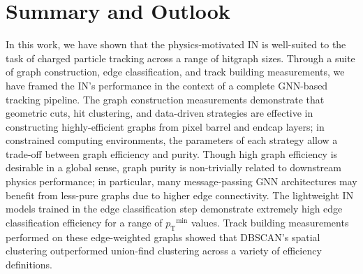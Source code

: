 \documentclass[twocolumn]{svjour3}
\newcommand{\pt}{\ensuremath{p_{\mathrm{T}}}\xspace}
\begin{document}


\section{Summary and Outlook}
\label{sec:summary}
In this work, we have shown that the physics-motivated IN is well-suited to the task of charged particle tracking across a range of hitgraph sizes. 
Through a suite of graph construction, edge classification, and track building measurements, we have framed the IN's performance in the context of a complete GNN-based tracking pipeline. 
The graph construction measurements demonstrate that geometric cuts, hit clustering, and data-driven strategies are effective in constructing highly-efficient graphs from pixel barrel and endcap layers; in constrained computing environments, the parameters of each strategy allow a trade-off between graph efficiency and purity. 
Though high graph efficiency is desirable in a global sense, graph purity is non-trivially related to downstream physics performance; in particular, many message-passing GNN architectures may benefit from less-pure graphs due to higher edge connectivity.
The lightweight IN models trained in the edge classification step demonstrate extremely high edge classification efficiency for a range of $\pt^\mathrm{min}$ values. 
Track building measurements performed on these edge-weighted graphs showed that DBSCAN's spatial clustering outperformed union-find clustering across a variety of efficiency definitions.
\end{document}
